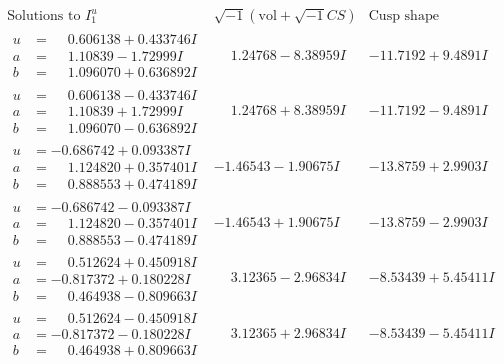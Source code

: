 \documentclass[1p]{elsarticle_modified}
\theoremstyle{definition}
\newcommand{\I}{\sqrt{-1}}
\begin{document}
$$\begin{array}{c|c|c}  
\text{Solutions to }I^u_{1}& \I (\text{vol} + \sqrt{-1}CS) & \text{Cusp shape}\\
 \hline 
\begin{aligned}
u &= \phantom{-}0.606138 + 0.433746 I \\
a &= \phantom{-}1.10839 - 1.72999 I \\
b &= \phantom{-}1.096070 + 0.636892 I\end{aligned}
 & \phantom{-}1.24768 - 8.38959 I & -11.7192 + 9.4891 I \\ \hline\begin{aligned}
u &= \phantom{-}0.606138 - 0.433746 I \\
a &= \phantom{-}1.10839 + 1.72999 I \\
b &= \phantom{-}1.096070 - 0.636892 I\end{aligned}
 & \phantom{-}1.24768 + 8.38959 I & -11.7192 - 9.4891 I \\ \hline\begin{aligned}
u &= -0.686742 + 0.093387 I \\
a &= \phantom{-}1.124820 + 0.357401 I \\
b &= \phantom{-}0.888553 + 0.474189 I\end{aligned}
 & -1.46543 - 1.90675 I & -13.8759 + 2.9903 I \\ \hline\begin{aligned}
u &= -0.686742 - 0.093387 I \\
a &= \phantom{-}1.124820 - 0.357401 I \\
b &= \phantom{-}0.888553 - 0.474189 I\end{aligned}
 & -1.46543 + 1.90675 I & -13.8759 - 2.9903 I \\ \hline\begin{aligned}
u &= \phantom{-}0.512624 + 0.450918 I \\
a &= -0.817372 + 0.180228 I \\
b &= \phantom{-}0.464938 - 0.809663 I\end{aligned}
 & \phantom{-}3.12365 - 2.96834 I & -8.53439 + 5.45411 I \\ \hline\begin{aligned}
u &= \phantom{-}0.512624 - 0.450918 I \\
a &= -0.817372 - 0.180228 I \\
b &= \phantom{-}0.464938 + 0.809663 I\end{aligned}
 & \phantom{-}3.12365 + 2.96834 I & -8.53439 - 5.45411 I \\ \hline\begin{aligned}

\end{aligned}
\end{array}$$
\end{document}
